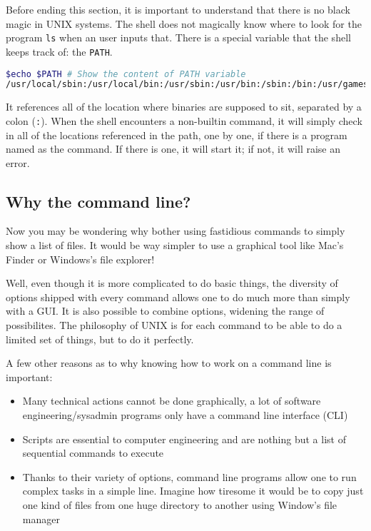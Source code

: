 \documentclass[12pt]{article}
\begin{document}
Before ending this section, it is important to understand that there is no black magic in UNIX systems. The shell does not magically know where to look for the program \texttt{ls} when an user inputs that. There is a special variable that the shell keeps track of: the \texttt{PATH}.

\begin{lstlisting}[language=bash]
$echo $PATH # Show the content of PATH variable
/usr/local/sbin:/usr/local/bin:/usr/sbin:/usr/bin:/sbin:/bin:/usr/games:/usr/local/games
\end{lstlisting}

It references all of the location where binaries are supposed to sit, separated by a colon (\texttt{:}).
When the shell encounters a non-builtin command, it will simply check in all of the locations referenced in the path, one by one, if there is a program named as the command. If there is one, it will start it; if not, it will raise an error.

\subsection{Why the command line?}

Now you may be wondering why bother using fastidious commands to simply show a list of files. It would be way simpler to use a graphical tool like Mac's Finder or Windows's file explorer!

Well, even though it is more complicated to do basic things, the diversity of options shipped with every command allows one to do much more than simply with a GUI.
It is also possible to combine options, widening the range of possibilites.
The philosophy of UNIX is for each command to be able to do a limited set of things, but to do it perfectly.

A few other reasons as to why knowing how to work on a command line is important:
\begin{itemize}
\item Many technical actions cannot be done graphically, a lot of software engineering/sysadmin programs only have a command line interface (CLI)
\item Scripts are essential to computer engineering and are nothing but a list of sequential commands to execute
\item Thanks to their variety of options, command line programs allow one to run complex tasks in a simple line. Imagine how tiresome it would be to copy just one kind of files from one huge directory to another using Window's file manager
\end{itemize}
\end{document}

